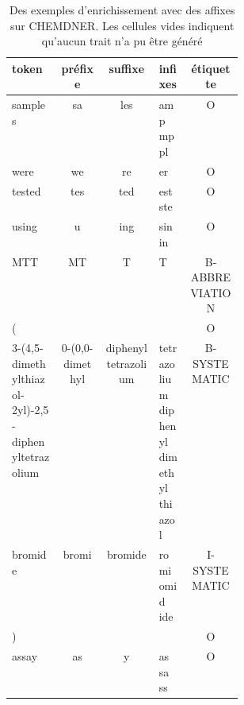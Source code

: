 \documentclass[PhD-Yoann-Dupont.tex]{subfiles}
\begin{document}
\begin{table}[ht!]
\centering
\footnotesize
\begin{tabular}{|p{0.21\linewidth}|c|c|p{0.13\linewidth}|c|}
\hline
token & préfixe & suffixe & infixes & étiquette\\
\hline
samples & sa & les & amp mp pl & O\\
\hline
were & we & re & er & O\\
\hline
tested & tes & ted & est ste & O\\
\hline
using & u & ing & sin in & O\\
\hline
MTT & MT & T & T & B-ABBREVIATION\\
\hline
( & & & & O\\
\hline
3-(4,5-dimethylthiazol-2yl)-2,5-diphenyltetrazolium & 0-(0,0-dimethyl & diphenyltetrazolium & tetrazolium diphenyl dimethyl thiazol & B-SYSTEMATIC\\
\hline
bromide & bromi & bromide & romi omid ide & I-SYSTEMATIC\\
\hline
) &  &  &  & O\\
\hline
assay & as & y & as sa ss & O\\
\hline
\end{tabular}
\caption{Des exemples d'enrichissement avec des affixes sur CHEMDNER. Les cellules vides indiquent qu'aucun trait n'a pu être généré}
\label{tab:affixes-example}
\end{table}
\end{document}
